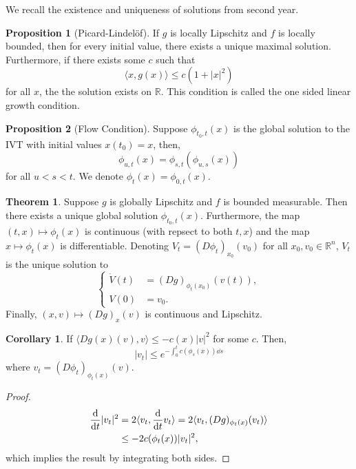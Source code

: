 \documentclass[]{article}
\theoremstyle{definition}
\newtheorem{theorem}{Theorem}
\newtheorem{corollary}{Corollary}[theorem]
\theoremstyle{definition}
\newtheorem{proposition}{Proposition}[section]
\begin{document}
We recall the existence and uniqueness of solutions from second year.

\begin{proposition}[Picard-Lindelöf]
  If \(g\) is locally Lipschitz and \(f\) is locally bounded, then for every 
  initial value, there exists a unique maximal solution. Furthermore, if 
  there exists some \(c\) such that 
  \[\langle x, g(x) \rangle \le c(1 + |x|^2)\]
  for all \(x\), the the solution exists on \(\mathbb{R}\). This condition 
  is called the one sided linear growth condition.
\end{proposition}

\begin{proposition}[Flow Condition]
  Suppose \(\phi_{t_0, t}(x)\) is the global solution to the IVT with initial 
  values \(x(t_0) = x\), then, 
  \[\phi_{u, t}(x) = \phi_{s, t}(\phi_{u, s}(x))\]
  for all \(u < s < t\). We denote \(\phi_t(x) = \phi_{0, t}(x)\).
\end{proposition}

\begin{theorem}
  Suppose \(g\) is globally Lipschitz and \(f\) is bounded measurable. Then 
  there exists a unique global solution \(\phi_{t_0, t}(x)\). 
  Furthermore, the map \((t, x) \mapsto \phi_t(x)\) is continuous (with repsect 
  to both \(t, x\)) and the map \(x \mapsto \phi_t(x)\) is differentiable. 
  Denoting \(V_t = (D\phi_t)_{x_0}(v_0)\) for all \(x_0, v_0 \in \mathbb{R}^n\),
  \(V_t\) is the unique solution to 
  \[\begin{cases}
    \dot V(t) & = (Dg)_{\phi_t(x_0)}(v(t)),\\
    V(0) & = v_0. 
  \end{cases}\] 
  Finally, \((x, v) \mapsto (Dg)_x(v)\) is continuous and Lipschitz.
\end{theorem}

\begin{corollary}
  If \(\langle Dg(x)(v), v\rangle \le -c(x)|v|^2\) for some \(c\). Then, 
  \[|v_t| \le e^{-\int_0^t c(\phi_s(x)) \dd s}\]
  where \(v_t = (D\phi_t)_{\phi_t(x)}(v)\).
\end{corollary}
\begin{proof}
  \[\begin{split}
    \dv{t}|v_t|^2 & = 2\langle v_t, \dv{t}v_t\rangle 
      = 2 \langle v_t, (Dg)_{\phi_t(x)}(v_t)\rangle\\
      & \le -2c(\phi_t(x))|v_t|^2,
  \end{split}\]
  which implies the result by integrating both sides.
\end{proof}
\end{document}
